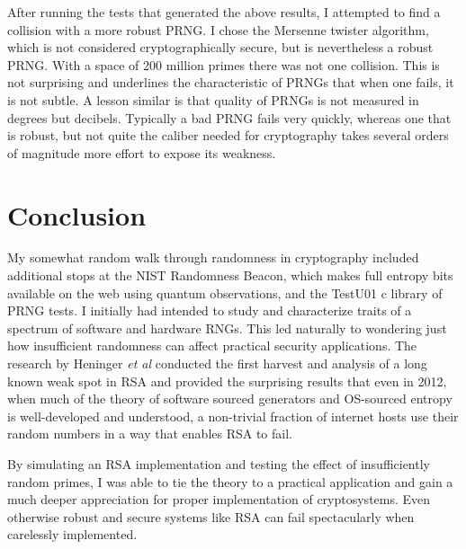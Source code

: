 \documentclass[conference]{/Users/paul/MSEE/ee595/project/report/IEEEtran/IEEEtran}
\begin{document}
After running the tests that generated the above results, I attempted to find a collision with a more robust PRNG. I chose the Mersenne twister algorithm, which is not considered cryptographically secure, but is nevertheless a robust PRNG. With a space of 200 million primes there was not one collision. This is not surprising and underlines the characteristic of PRNGs that when one fails, it is not subtle. A lesson similar is that quality of PRNGs is not measured in degrees but decibels. Typically a bad PRNG fails very quickly, whereas one that is robust, but not quite the caliber needed for cryptography takes several orders of magnitude more effort to expose its weakness. 

\section{Conclusion}
My somewhat random walk through randomness in cryptography included additional stops at the NIST Randomness Beacon, which makes full entropy bits available on the web using quantum observations, and the TestU01 c library of PRNG tests. I initially had intended to study and characterize traits of a spectrum of software and hardware RNGs. This led naturally to wondering just how insufficient randomness can affect practical security applications. The research by Heninger \textit{et al} conducted the first harvest and analysis of a long known weak spot in RSA and provided the surprising results that even in 2012, when much of the theory of software sourced generators and OS-sourced entropy is well-developed and understood, a non-trivial fraction of internet hosts use their random numbers in a way that enables RSA to fail. 

By simulating an RSA implementation and testing the effect of insufficiently random primes, I was able to tie the theory to a practical application and gain a much deeper appreciation for proper implementation of cryptosystems. Even otherwise robust and secure systems like RSA can fail spectacularly when carelessly implemented. 



\end{document}

